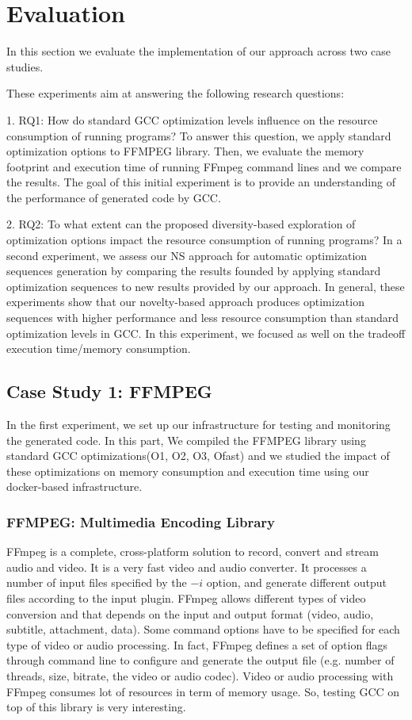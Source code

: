\section{Evaluation}
In this section we evaluate the implementation of our
approach across two case studies. 

These experiments aim at answering the following research questions:

1. RQ1: How do standard GCC optimization levels influence
on the resource consumption of running programs?
To answer this question, we apply standard optimization options to FFMPEG library. Then, we evaluate the memory footprint and execution time of running FFmpeg command lines and we
compare the results. The goal of this initial experiment is to
provide an understanding of the performance of
generated code by GCC.

2. RQ2: To what extent can the proposed diversity-based
exploration of optimization options impact the resource
consumption of running programs?
In a second experiment, we assess our NS
approach for automatic optimization sequences generation by
comparing the results founded by applying standard optimization sequences to new
results provided by our approach. In general, these experiments
show that our novelty-based approach produces optimization
sequences with higher performance and less resource consumption
than standard optimization levels in GCC. In this experiment, we focused as well on the tradeoff execution time/memory consumption.




\subsection{Case Study 1: FFMPEG}
In the first experiment, we set up our infrastructure for testing and monitoring the generated code. In this part, We compiled the FFMPEG library using standard GCC optimizations(O1, O2, O3, Ofast) and we studied the impact of these optimizations on memory consumption and execution time using our docker-based infrastructure.

\subsubsection{FFMPEG: Multimedia Encoding Library}
FFmpeg is a complete, cross-platform solution to record, convert and stream audio and video. It is a very fast video and audio converter. It processes a number of input files specified by the $-i$ option, and generate different output files according to the input plugin. FFmpeg allows different types of video conversion and that depends on the input and output format (video, audio, subtitle, attachment, data).
Some command options have to be specified for each type of video or audio processing. In fact,
FFmpeg defines a set of option flags through command line to configure and generate the output
file (e.g. number of threads, size, bitrate, the video or audio codec). Video or audio processing with FFmpeg consumes lot of resources in term of memory usage. So, testing GCC on top of this library is very interesting. 
